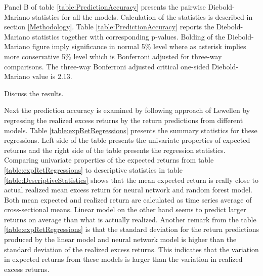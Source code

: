 \documentclass{article}
\begin{document}
Panel B of table \ref{table:PredictionAccuracy} presents the pairwise Diebold-Mariano statistics for all the models. Calculation of the statistics is described in section \ref{Methodology}. Table \ref{table:PredictionAccuracy} reports the Diebold-Mariano statistics together with corresponding p-values. Bolding of the Diebold-Mariano figure imply significance in normal 5\% level where as asterisk implies more conservative 5\% level which is Bonferroni adjusted for three-way comparisons. The three-way Bonferroni adjusted critical one-sided Diebold-Mariano value is 2.13. \par

Discuss the results.

Next the prediction accuracy is examined by following approach of Lewellen \citeyear{Lewellen2015} by regressing the realized excess returns by the return predictions from different models. Table \ref{table:expRetRegressions} presents the summary statistics for these regressions. Left side of the table presents the univariate properties of expected returns and the right side of the table presents the regression statistics. Comparing univariate properties of the expected returns from table \ref{table:expRetRegressions} to descriptive statistics in table \ref{table:DescriptiveStatistics} shows that the mean expected return is really close to actual realized mean excess return for neural network and random forest model. Both mean expected and realized return are calculated as time series average of cross-sectional means. Linear model on the other hand seems to predict larger returns on average than what is actually realized. Another remark from the table \ref{table:expRetRegressions} is that the standard deviation for the return predictions produced by the linear model and neural network model is higher than the standard deviation of the realized excess returns. This indicates that the variation in expected returns from these models is larger than the variation in realized excess returns. \par
\end{document}
